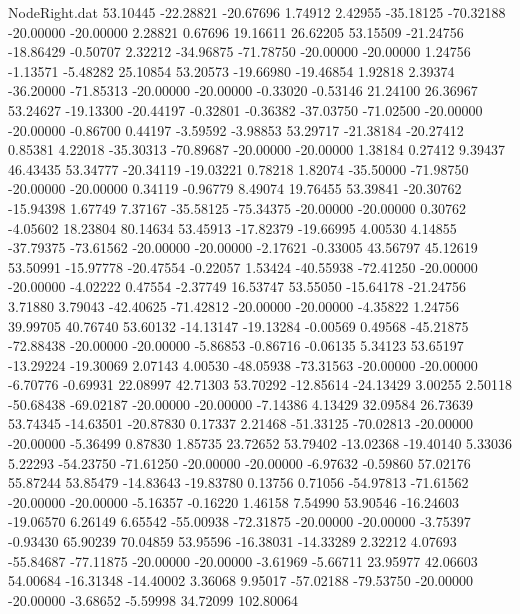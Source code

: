 \begin{filecontents}{NodeRight.dat}
  53.10445  -22.28821  -20.67696     1.74912    2.42955  -35.18125  -70.32188  -20.00000  -20.00000    2.28821    0.67696   19.16611   26.62205
  53.15509  -21.24756  -18.86429    -0.50707    2.32212  -34.96875  -71.78750  -20.00000  -20.00000    1.24756   -1.13571   -5.48282   25.10854
  53.20573  -19.66980  -19.46854     1.92818    2.39374  -36.20000  -71.85313  -20.00000  -20.00000   -0.33020   -0.53146   21.24100   26.36967
  53.24627  -19.13300  -20.44197    -0.32801   -0.36382  -37.03750  -71.02500  -20.00000  -20.00000   -0.86700    0.44197   -3.59592   -3.98853
  53.29717  -21.38184  -20.27412     0.85381    4.22018  -35.30313  -70.89687  -20.00000  -20.00000    1.38184    0.27412    9.39437   46.43435
  53.34777  -20.34119  -19.03221     0.78218    1.82074  -35.50000  -71.98750  -20.00000  -20.00000    0.34119   -0.96779    8.49074   19.76455
  53.39841  -20.30762  -15.94398     1.67749    7.37167  -35.58125  -75.34375  -20.00000  -20.00000    0.30762   -4.05602   18.23804   80.14634
  53.45913  -17.82379  -19.66995     4.00530    4.14855  -37.79375  -73.61562  -20.00000  -20.00000   -2.17621   -0.33005   43.56797   45.12619
  53.50991  -15.97778  -20.47554    -0.22057    1.53424  -40.55938  -72.41250  -20.00000  -20.00000   -4.02222    0.47554   -2.37749   16.53747
  53.55050  -15.64178  -21.24756     3.71880    3.79043  -42.40625  -71.42812  -20.00000  -20.00000   -4.35822    1.24756   39.99705   40.76740
  53.60132  -14.13147  -19.13284    -0.00569    0.49568  -45.21875  -72.88438  -20.00000  -20.00000   -5.86853   -0.86716   -0.06135    5.34123
  53.65197  -13.29224  -19.30069     2.07143    4.00530  -48.05938  -73.31563  -20.00000  -20.00000   -6.70776   -0.69931   22.08997   42.71303
  53.70292  -12.85614  -24.13429     3.00255    2.50118  -50.68438  -69.02187  -20.00000  -20.00000   -7.14386    4.13429   32.09584   26.73639
  53.74345  -14.63501  -20.87830     0.17337    2.21468  -51.33125  -70.02813  -20.00000  -20.00000   -5.36499    0.87830    1.85735   23.72652
  53.79402  -13.02368  -19.40140     5.33036    5.22293  -54.23750  -71.61250  -20.00000  -20.00000   -6.97632   -0.59860   57.02176   55.87244
  53.85479  -14.83643  -19.83780     0.13756    0.71056  -54.97813  -71.61562  -20.00000  -20.00000   -5.16357   -0.16220    1.46158    7.54990
  53.90546  -16.24603  -19.06570     6.26149    6.65542  -55.00938  -72.31875  -20.00000  -20.00000   -3.75397   -0.93430   65.90239   70.04859
  53.95596  -16.38031  -14.33289     2.32212    4.07693  -55.84687  -77.11875  -20.00000  -20.00000   -3.61969   -5.66711   23.95977   42.06603
  54.00684  -16.31348  -14.40002     3.36068    9.95017  -57.02188  -79.53750  -20.00000  -20.00000   -3.68652   -5.59998   34.72099  102.80064

\end{filecontents}

